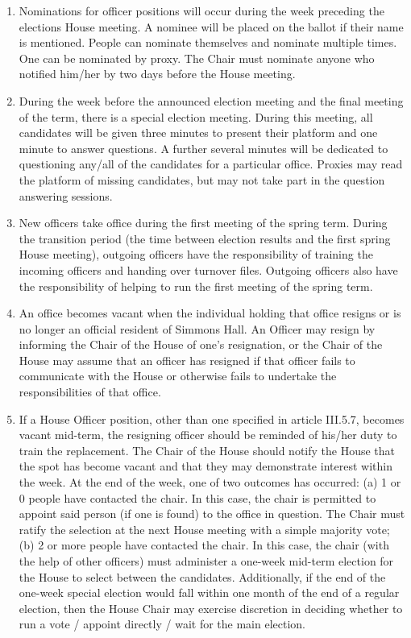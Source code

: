 \documentclass[letterpaper]{article}
\begin{document}
\begin{enumerate}
\begin{enumerate}
\begin{enumerate}
\item Nominations for officer positions will occur during the week preceding the elections House meeting. A nominee will be placed on the ballot if their name is mentioned. People can nominate themselves and nominate multiple times. One can be nominated by proxy. The Chair must nominate anyone who notified him/her by two days before the House meeting.

\item During the week before the announced election meeting and the final meeting of the term, there is a special election meeting. During this meeting, all candidates will be given three minutes to present their platform and one minute to answer questions. A further several minutes will be dedicated to questioning any/all of the candidates for a particular office. Proxies may read the platform of missing candidates, but may not take part in the question answering sessions.

\item New officers take office during the first meeting of the spring term. During the transition period (the time between election results and the first spring House meeting), outgoing officers have the responsibility of training the incoming officers and handing over turnover files. Outgoing officers also have the responsibility of
helping to run the first meeting of the spring term.

\item An office becomes vacant when the individual holding that office resigns or is no longer an official resident of Simmons Hall. An Officer may resign by informing the Chair of the House of one's resignation, or the Chair of the House may assume that an officer has resigned if that officer fails to communicate with the House or otherwise fails to undertake the responsibilities of that office.

\item If a House Officer position, other than one specified in article III.5.7, becomes vacant mid-term, the resigning officer should be reminded of his/her duty to train the replacement. The Chair of the House should notify the House that the spot has become vacant and that they may demonstrate interest within the week. At the end of the week, one of two outcomes has occurred: (a) 1 or 0 people have contacted the chair. In this case, the chair is permitted to appoint said person (if one is found) to the office in question. The Chair must ratify the selection at the next House meeting with a simple majority vote; (b) 2 or more people have contacted the chair. In this case, the chair (with the help of other officers) must administer a one-week mid-term election for the House to select between the candidates. Additionally, if the end of the one-week special election
would fall within one month of the end of a regular election, then the House Chair may exercise discretion in deciding whether to run a vote / appoint directly / wait for the main election.


\end{enumerate}
\end{enumerate}
\end{enumerate}
\end{document}

